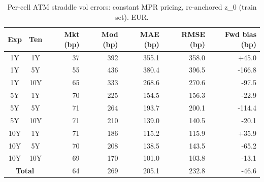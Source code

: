 \begin{table}[H]
\centering
\caption{Per-cell ATM straddle vol errors: constant MPR pricing, re-anchored z_0 (train set). EUR.}
\label{tab:constant_mpr_anchored_per_cell_train}
\small
\begin{tabular}{@{}ccrrrrr@{}}
\toprule
\textbf{Exp} & \textbf{Ten} & \textbf{Mkt (bp)} & \textbf{Mod (bp)} & \textbf{MAE (bp)} & \textbf{RMSE (bp)} & \textbf{Fwd bias (bp)} \\
\midrule
  1Y & 1Y & 37 & 392 & 355.1 & 358.0 & +45.0 \\
  1Y & 5Y & 55 & 436 & 380.4 & 396.5 & -166.8 \\
  1Y & 10Y & 65 & 333 & 268.6 & 270.6 & -97.5 \\
  \midrule
  5Y & 1Y & 70 & 225 & 154.5 & 156.3 & -22.9 \\
  5Y & 5Y & 71 & 264 & 193.7 & 200.1 & -114.4 \\
  5Y & 10Y & 71 & 210 & 139.0 & 140.5 & -20.1 \\
  \midrule
  10Y & 1Y & 71 & 186 & 115.2 & 115.9 & +35.9 \\
  10Y & 5Y & 70 & 208 & 138.5 & 143.5 & -65.2 \\
  10Y & 10Y & 69 & 170 & 101.0 & 103.8 & -13.1 \\
  \midrule
  \multicolumn{2}{c}{\textbf{Total}} & 64 & 269 & 205.1 & 232.8 & -46.6 \\
\bottomrule
\end{tabular}
\end{table}